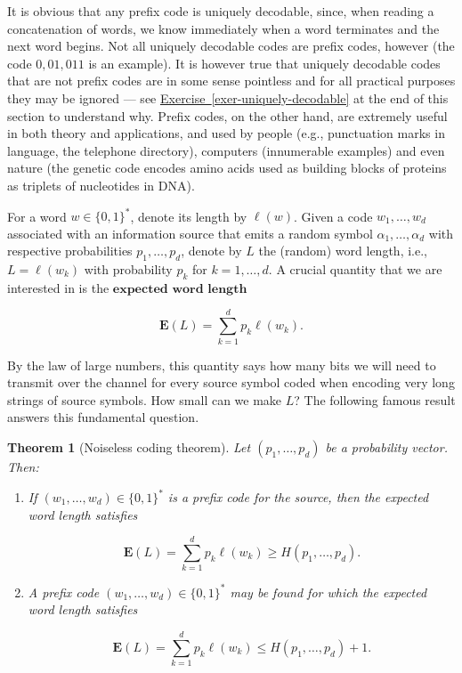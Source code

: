 \documentclass[11pt]{report}
\theoremstyle{plain}
\newtheorem{thm}{Theorem}[chapter]
\theoremstyle{definition}
\begin{document}
\noindent It is obvious that any prefix code is uniquely
decodable, since, when reading a concatenation of
words, we know immediately when a word terminates and
the next word begins. Not all uniquely decodable codes
are prefix codes, however (the code $0, 01, 011$ is
an example). It is however true that uniquely
decodable codes that are not prefix codes are in some
sense pointless and for all practical purposes they
may be ignored --- see \texorpdfstring{\hyperref[exer-uniquely-decodable]{Exercise~\ref*{exer-uniquely-decodable}}}{Exercise} at the end of this section
to understand why. Prefix codes, on the other hand,
are extremely useful in both theory and applications,
and used by people (e.g., punctuation marks in
language, the telephone directory), computers
(innumerable examples) and even nature (the genetic
code encodes amino acids used as building blocks of
proteins as triplets of nucleotides in DNA).

For a word $w\in \{0,1\}^*$, denote its length by
$\ell(w)$. Given a code $w_1,\ldots,w_d$ associated
with an information source that emits a random symbol
$\alpha_1,\ldots,\alpha_d$ with respective
probabilities $p_1,\ldots,p_d$, denote by $L$ the
(random) word length, i.e., $L=\ell(w_k)$ with
probability $p_k$ for $k=1,\ldots,d$. A crucial
quantity that we are interested in is the
$\textbf{expected word length}$

\[
\mathbf{E}(L) = \sum_{k=1}^d p_k \ell(w_k).
\]

\noindent By the law of large numbers, this quantity says how
many bits we will need to transmit over the channel
for every source symbol coded when encoding very long
strings of source symbols. How small can we make $L$?
The following famous result answers this fundamental
question.

\begin{thm}[Noiseless coding theorem]
Let $(p_1,\ldots,p_d)$ be a probability vector. Then:

\begin{enumerate}[label=\arabic*.]
\item If $(w_1,\ldots,w_d) \in \{0,1\}^*$ is a prefix code
for the source, then the expected word length
satisfies

\[
\mathbf{E}(L) = \sum_{k=1}^d p_k \ell(w_k) \ge H(p_1,\ldots, p_d).
\]

\item A prefix code $(w_1,\ldots,w_d) \in \{0,1\}^*$ may be
found for which the expected word length satisfies

\[
\mathbf{E}(L) = \sum_{k=1}^d p_k \ell(w_k) \le H(p_1,\ldots, p_d) + 1.
\]
\end{enumerate}

\end{thm}
\end{document}

